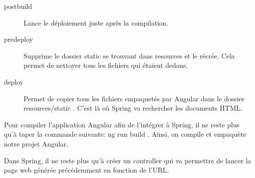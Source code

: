 \begin{description}
	\item[postbuild] Lance le déploiement juste après la compilation.
	\item[predeploy] Supprime le dossier \og{}static \fg{} se trouvant dans \og{}resources \fg{} et le récrée. Cela permet de nettoyer tous les fichiers qui étaient dedans.
	\item[deploy] Permet de copier tous les fichiers empaquetés par Angular dans le dossier \og{}resources/static \fg{}. C'est là où Spring va rechercher les documents HTML\@.
\end{description}

Pour compiler l'application Angular afin de l'intégrer à Spring, il ne reste plus qu'à taper la commande suivante: \og{}ng run build \fg{}. Ainsi, on compile et empaquète notre projet Angular.

Dans Spring, il ne reste plus qu'à créer un \og{}controller \fg{} qui va permettre de lancer la page web générée précédemment en fonction de l'URL\@.

 